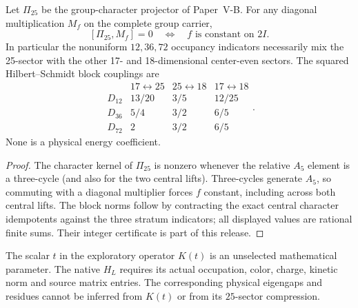 \documentclass[12pt,a4paper]{article}
\begin{document}
\begin{proposition}
\label{p10:prop:v338-diagonal-occupancy-leakage}
Let $\Pi_{25}$ be the group-character projector of Paper~V-B.
For any diagonal multiplication $M_f$ on the complete group carrier,
\[
 [\Pi_{25},M_f]=0\quad\Longleftrightarrow\quad
 f\text{ is constant on }2I.
\]
In particular the nonuniform $12,36,72$ occupancy indicators
necessarily mix the 25-sector with the other 17- and 18-dimensional
center-even sectors.  The squared Hilbert--Schmidt block couplings
are
\[
 \begin{array}{c|ccc}
 &17\leftrightarrow25&25\leftrightarrow18&17\leftrightarrow18\\\hline
 D_{12}&13/20&3/5&12/25\\
 D_{36}&5/4&3/2&6/5\\
 D_{72}&2&3/2&6/5
 \end{array}.
\]
None is a physical energy coefficient.
\end{proposition}
\begin{proof}
The character kernel of $\Pi_{25}$ is nonzero whenever the
relative $A_5$ element is a three-cycle (and also for the two
central lifts).  Three-cycles generate $A_5$, so commuting with a
diagonal multiplier forces $f$ constant, including across both
central lifts.  The block norms follow by contracting the exact
central character idempotents against the three stratum indicators;
all displayed values are rational finite sums.  Their integer
certificate is part of this release.
\end{proof}

\begin{remark}
The scalar $t$ in the exploratory operator $K(t)$ is an
unselected mathematical parameter.  The native $H_L$ requires
its actual occupation, color, charge, kinetic norm and source
matrix entries.  The corresponding physical eigengaps and residues
cannot be inferred from $K(t)$ or from its $25$-sector compression.
\end{remark}



\end{document}
